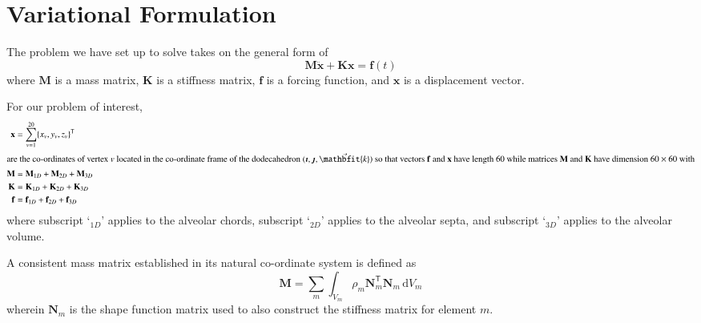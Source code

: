 \setcounter{section}{0}
\part{Variational Formulation}
\label{partVariational}

The problem we have set up to solve takes on the general form of 
\begin{equation}
\mathbf{M} \ddot{\mathbf{x}} + \mathbf{K} \mathbf{x} = \mathbf{f}(t)
\end{equation}
where $\mathbf{M}$ is a mass matrix, $\mathbf{K}$ is a stiffness matrix, $\mathbf{f}$ is a forcing function, and $\mathbf{x}$ is a displacement vector.  

For our problem of interest, 
\begin{subequations}
	\begin{align}
	\mathbf{x} & = \sum_{v=1}^{20} \{ x_v , y_v , z_v \}^{\mathsf{T}} \\
	\intertext{are the co-ordinates of vertex $v$ located in the co-ordinate frame of the dodecahedron $(\boldsymbol{\imath} , \boldsymbol{\jmath} , \vec{\mathbfit{k}} )$ so that vectors $\mathbf{f}$ and $\mathbf{x}$ have length 60 while matrices $\mathbf{M}$ and $\mathbf{K}$ have dimension $60 \times 60$ with}
	\mathbf{M} & = \mathbf{M}_{1D} + \mathbf{M}_{2D} + \mathbf{M}_{3D} \\
	\mathbf{K} & = \mathbf{K}_{1D} + \mathbf{K}_{2D} + \mathbf{K}_{3D} \\
	\mathbf{f} & = \mathbf{f}_{1D} + \mathbf{f}_{2D} + \mathbf{f}_{3D}
	\end{align}
\end{subequations}
where subscript `$\mbox{}_{1D}$' applies to the alveolar chords, subscript `$\mbox{}_{2D}$' applies to the alveolar septa, and subscript `$\mbox{}_{3D}$' applies to the alveolar volume.

A consistent mass matrix \cite{Archer65} established in its natural co-ordinate system is defined as
\begin{equation}
\mathbf{M} = \sum_m \int_{V_m} \rho_m \mathbf{N}_m^{\mathsf{T}} \mathbf{N}_m \,
\mathrm{d} V_m
\label{consistentMassMatrix}
\end{equation}
wherein $\mathbf{N}_m$ is the shape function matrix used to also construct the stiffness matrix for element $m$.

